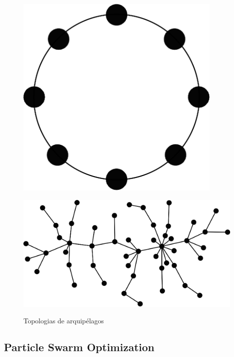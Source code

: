 \begin{figure}[H]
    \centering
    \begin{minipage}{.2\textwidth}
        \includegraphics[width=0.9\textwidth]{figures/ring}
        \label{fig:ring}
    \end{minipage}%
    \quad\quad\quad\quad
    \begin{minipage}{.35\textwidth}
        \includegraphics[width=\textwidth]{figures/barabasi-albert}
        \label{fig:barabasi-albert}
    \end{minipage}

    \caption{Topologias de arquipélagos}
\end{figure}

\subsection{Particle Swarm Optimization}

